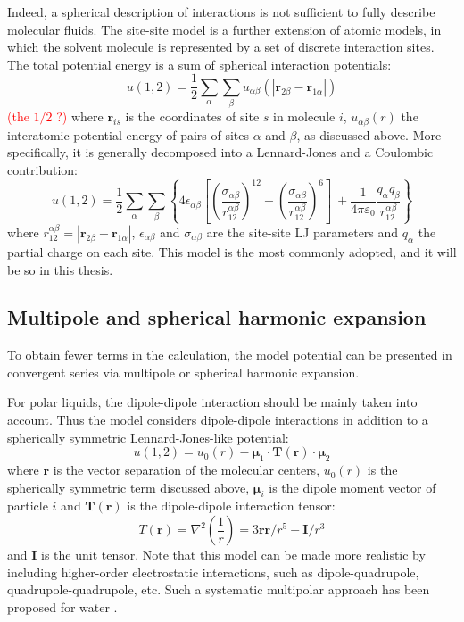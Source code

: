 Indeed, a spherical description of interactions is not sufficient
to fully describe molecular fluids. The site-site model is a further
extension of atomic models, in which the solvent molecule is represented
by a set of discrete interaction sites. The total potential energy
is a sum of spherical interaction potentials:
\begin{equation}
u(1,2)=\frac{1}{2}\sum_{\alpha}\sum_{\beta}u_{\alpha\beta}(\left|\mathbf{r}_{2\beta}-\mathbf{r}_{1\alpha}\right|)
\end{equation}
\textcolor{red}{(the $1/2$ ?) }where $\mathbf{r}_{is}$ is the coordinates
of site $s$ in molecule $i$, $u_{\alpha\beta}(r)$ the interatomic
potential energy of pairs of sites $\alpha$ and $\beta$, as discussed
above. More specifically, it is generally decomposed into a Lennard-Jones
and a Coulombic contribution:
\begin{equation}
u(1,2)=\frac{1}{2}\sum_{\alpha}\sum_{\beta}\left\{ 4\epsilon_{\alpha\beta}\left[\left(\frac{\sigma_{\alpha\beta}}{r_{12}^{\alpha\beta}}\right)^{12}-\left(\frac{\sigma_{\alpha\beta}}{r_{12}^{\alpha\beta}}\right)^{6}\right]\:+\frac{1}{4\pi\varepsilon_{0}}\frac{q_{\alpha}q_{\beta}}{r_{12}^{\alpha\beta}}\right\} 
\end{equation}
where $r_{12}^{\alpha\beta}=\left|\mathbf{r}_{2\beta}-\mathbf{r}_{1\alpha}\right|$,
$\epsilon_{\alpha\beta}$ and $\sigma_{\alpha\beta}$ are the site-site
LJ parameters and $q_{\alpha}$ the partial charge on each site. This
model is the most commonly adopted, and it will be so in this thesis.

\subsection{Multipole and spherical harmonic expansion}

To obtain fewer terms in the calculation, the model potential can
be presented in convergent series via multipole or spherical harmonic
expansion.

For polar liquids, the dipole-dipole interaction should be mainly
taken into account. Thus the model considers dipole-dipole interactions
in addition to a spherically symmetric Lennard-Jones-like potential:
\begin{equation}
u(1,2)=u_{0}(r)-\boldsymbol{\mu}_{1}\cdot\mathbf{T}(\mathbf{r})\cdot\boldsymbol{\mu}_{2}
\end{equation}
where $\mathbf{r}$ is the vector separation of the molecular centers,
$u_{0}(r)$ is the spherically symmetric term discussed above, $\boldsymbol{\mu}_{i}$
is the dipole moment vector of particle $i$ and $\mathbf{T}(\mathbf{r})$
is the dipole-dipole interaction tensor:
\begin{equation}
T(\mathbf{r})=\nabla^{2}\left(\dfrac{1}{r}\right)=3\mathbf{r}\mathbf{r}/r^{5}-\mathbf{I}/r^{3}
\end{equation}
and $\mathbf{I}$ is the unit tensor. Note that this model can be
made more realistic by including higher-order electrostatic interactions,
such as dipole-quadrupole, quadrupole-quadrupole, etc. Such a systematic
multipolar approach has been proposed for water \citep{Chowdhuri_2006}.

